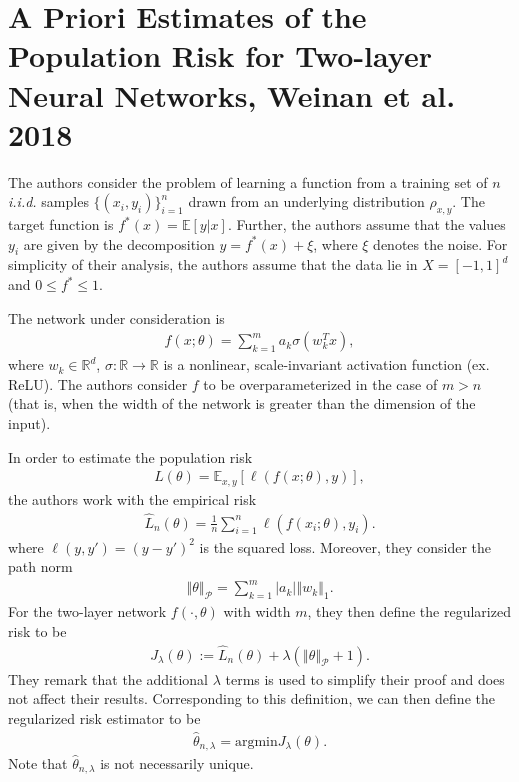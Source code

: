 \documentclass{article}
\begin{document}
\section{A Priori Estimates of the Population Risk for Two-layer Neural Networks, Weinan et al. 2018}

The authors consider the problem of learning a function from a training set of $n$ \textit{i.i.d.} samples $\{(x_i, y_i)\}_{i=1}^n$ drawn from an underlying distribution $\rho_{x,y}$. The target function is $f^*(x) = \mathbb{E}[y|x]$. Further, the authors assume that the values $y_i$ are given by the decomposition $y = f^*(x) + \xi$, where $\xi$ denotes the noise. For simplicity of their analysis, the authors assume that the data lie in $X = [-1, 1]^d$ and $0 \leq f^* \leq 1$.

The network under consideration is 
\begin{align*}
    f(x; \theta) = \sum_{k=1}^m a_k \sigma(w_k^Tx),
\end{align*}
where $w_k \in \mathbb{R}^d$, $\sigma: \mathbb{R} \rightarrow \mathbb{R}$ is a nonlinear, scale-invariant activation function (ex. ReLU). The authors consider $f$ to be overparameterized in the case of $m > n$ (that is, when the width of the network is greater than the dimension of the input).

In order to estimate the population risk
\begin{align*}
    L(\theta) = \mathbb{E}_{x,y}[\ell(f(x; \theta), y)],
\end{align*}
the authors work with the empirical risk
\begin{align*}
    \hat{L}_n(\theta) = \frac{1}{n} \sum_{i=1}^n \ell(f(x_i; \theta), y_i).
\end{align*}
where $\ell(y, y') = (y - y')^2$ is the squared loss. Moreover, they consider the path norm
\begin{align*}
    \left\Vert \theta \right\Vert_{\mathcal{P}} = \sum_{k=1}^m |a_k| \left\Vert w_k \right\Vert_1.
\end{align*}
For the two-layer network $f(\cdot, \theta)$ with width $m$, they then define the regularized risk to be 
\begin{align*}
    J_{\lambda}(\theta) := \hat{L}_n(\theta) + \lambda(\left\Vert \theta \right\Vert_{\mathcal{P}} + 1).
\end{align*}
They remark that the additional $\lambda$ terms is used to simplify their proof and does not affect their results. Corresponding to this definition, we can then define the regularized risk estimator to be 
\begin{align*}
    \hat{\theta}_{n, \lambda} = \text{argmin} J_{\lambda}(\theta).
\end{align*}
Note that $\hat{\theta}_{n, \lambda}$ is not necessarily unique.
\end{document}
